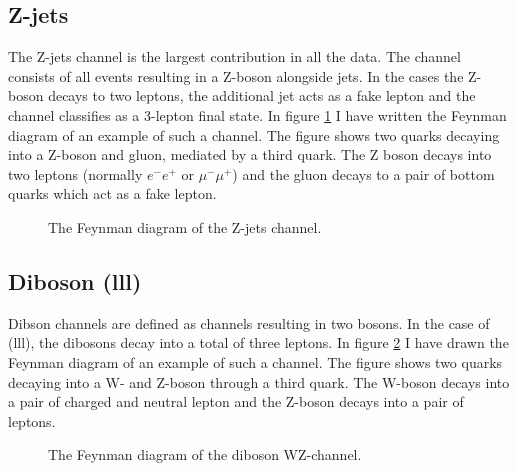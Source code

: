 \subsection{Z-jets}
The Z-jets channel is the largest contribution in all the data. The channel consists of all events
resulting in a Z-boson alongside jets. In the cases the Z-boson decays to two leptons, the additional 
jet acts as a fake lepton and the channel classifies as a 3-lepton final state. In figure \ref{fig:z_pjets} 
I have written the Feynman diagram of an example of such a channel. The figure shows two quarks decaying 
into a Z-boson and gluon, mediated by a third quark. The Z boson decays into two leptons (normally 
$e^-e^+$ or $\mu^- \mu^+$) and the gluon decays to a pair of bottom quarks which act as a fake lepton. 
\begin{figure}
    \centering
    \caption{The Feynman diagram of the  Z-jets channel.}
    \label{fig:z_pjets}
\end{figure}

\subsection{Diboson (lll)}
Dibson channels are defined as channels resulting in two bosons. In the case of (lll), the dibosons
decay into a total of three leptons. In figure \ref{fig:wz} I have drawn the Feynman diagram of an 
example of such a channel. The figure shows two quarks decaying into a W- and Z-boson through a 
third quark. The W-boson decays into a pair of charged and neutral lepton and the Z-boson decays 
into a pair of leptons. 
\begin{figure}
    \centering
    \caption{The Feynman diagram of the diboson WZ-channel.}
    \label{fig:wz}
\end{figure}
